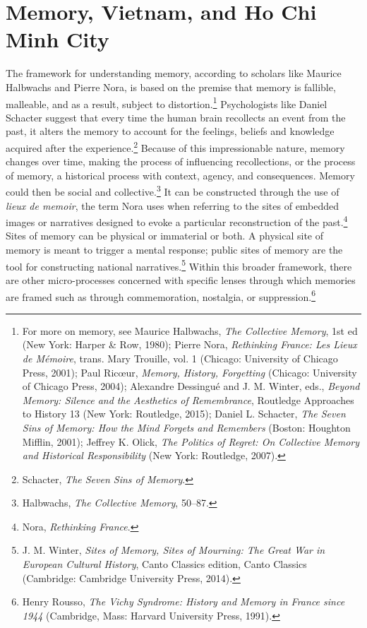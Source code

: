 \section{Memory, Vietnam, and Ho Chi Minh City}
The framework for understanding memory, according to scholars like Maurice Halbwachs and Pierre Nora, is based on the premise that memory is fallible, malleable, and as a result, subject to distortion.\footnote{For more on memory, see Maurice Halbwachs, \textit{The Collective Memory}, 1st ed (New York: Harper \& Row, 1980); Pierre Nora, \textit{Rethinking France: Les Lieux de Mémoire}, trans. Mary Trouille, vol. 1 (Chicago: University of Chicago Press, 2001); Paul Ricœur, \textit{Memory, History, Forgetting} (Chicago: University of Chicago Press, 2004); Alexandre Dessingué and J. M. Winter, eds., \textit{Beyond Memory: Silence and the Aesthetics of Remembrance}, Routledge Approaches to History 13 (New York: Routledge, 2015); Daniel L. Schacter, \textit{The Seven Sins of Memory: How the Mind Forgets and Remembers} (Boston: Houghton Mifflin, 2001); Jeffrey K. Olick, \textit{The Politics of Regret: On Collective Memory and Historical Responsibility} (New York: Routledge, 2007).} Psychologists like Daniel Schacter suggest that every time the human brain recollects an event from the past, it alters the memory to account for the feelings, beliefs and knowledge acquired after the experience.\footnote{Schacter, \textit{The Seven Sins of Memory}.} Because of this impressionable nature, memory changes over time, making the process of influencing recollections, or the process of memory, a historical process with context, agency, and consequences. Memory could then be social and collective.\footnote{Halbwachs, \textit{The Collective Memory}, 50–87.} It can be constructed through the use of \textit{lieux de memoir}, the term Nora uses when referring to the sites of embedded images or narratives designed to evoke a particular reconstruction of the past.\footnote{Nora, \textit{Rethinking France}.} Sites of memory can be physical or immaterial or both. A physical site of memory is meant to trigger a mental response; public sites of memory are the tool for constructing national narratives.\footnote{J. M. Winter, \textit{Sites of Memory, Sites of Mourning: The Great War in European Cultural History}, Canto Classics edition, Canto Classics (Cambridge: Cambridge University Press, 2014).} Within this broader framework, there are other micro-processes concerned with specific lenses through which memories are framed such as through commemoration, nostalgia, or suppression.\footnote{Henry Rousso, \textit{The Vichy Syndrome: History and Memory in France since 1944} (Cambridge, Mass: Harvard University Press, 1991).} 

